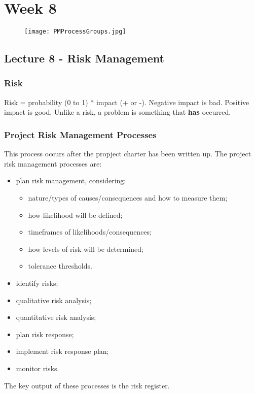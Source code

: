 \documentclass[journal]{IEEEtran}
\begin{document}
\section{Week 8}
	\begin{figure}[h]
		\hfill\texttt{[image: PMProcessGroups.jpg]}\hspace*{\fill}
	\end{figure}
\subsection{\textbf{Lecture 8 - Risk Management}}
\subsubsection{Risk}
Risk = probability (0 to 1) * impact (+ or -). Negative impact is bad. Positive impact is good. Unlike a risk, a problem is something that \textbf{has} occurred.
\subsubsection{Project Risk Management Processes}
This process occurs after the propject charter has been written up. The project risk management processes are:
\begin{itemize}
	\item plan risk management, considering:
	\begin{itemize}
		\item nature/types of causes/consequences and how to measure them;
		\item how likelihood will be defined;
		\item timeframes of likelihoods/consequences;
		\item how levels of risk will be determined;
		\item tolerance thresholds.
	\end{itemize}
	\item identify risks;
	\item qualitative risk analysis;
	\item quantitative risk analysis;
	\item plan risk response;
	\item implement risk response plan;
	\item monitor risks.
\end{itemize}
The key output of these processes is the risk register.
\end{document}
